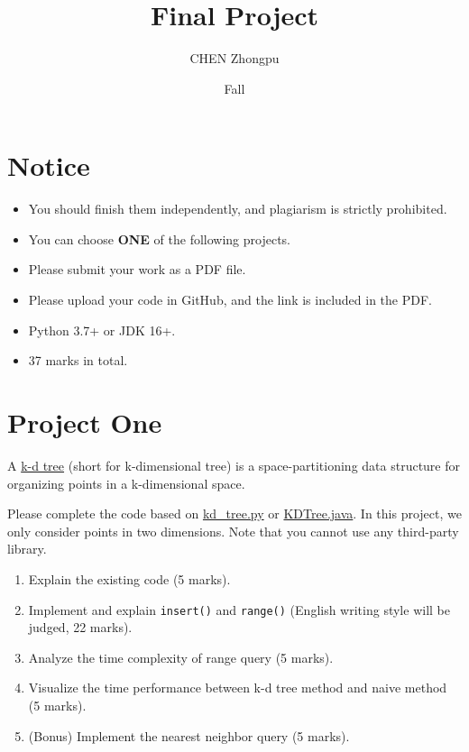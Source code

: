 \documentclass{article}
\title{Final Project}
\author{CHEN Zhongpu}
\date{Fall \the\year}
\begin{document}
\maketitle

\section*{Notice}
\begin{itemize}
	\item You should finish them independently, and plagiarism is strictly prohibited.
	\item You can choose \textbf{ONE} of the following projects.
	\item Please submit your work as a PDF file.
	\item Please upload your code in GitHub, and the link is included in the PDF.
	\item Python 3.7+ or JDK 16+.
	\item 37 marks in total.
\end{itemize}

\section{Project One}

A \href{https://en.wikipedia.org/wiki/K-d_tree}{k-d tree} (short for k-dimensional tree) is a space-partitioning data structure for organizing points in a k-dimensional space.

Please complete the code based on \href{https://github.com/ChenZhongPu/data-structure-swufe/blob/master/code/python/tree/kd_tree.py}{kd\_tree.py} or \href{https://github.com/ChenZhongPu/data-structure-swufe/blob/master/code/java/tree/src/main/java/org/swufe/KDTree.java}{KDTree.java}. In this project, we only consider points in two dimensions. Note that you cannot use any third-party library.

\begin{enumerate}
	\item Explain the existing code (5 marks).
	\item Implement and explain \texttt{insert()} and \texttt{range()} (English writing style will be judged, 22 marks).
	\item Analyze the time complexity of range query (5 marks).
	\item Visualize the time performance between k-d tree method and naive method (5 marks).
	\item (Bonus) Implement the nearest neighbor query (5 marks).
\end{enumerate}
\end{document}
